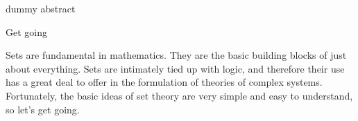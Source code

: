 \documentclass[a4paper]{cnx}
\begin{document}
\begin{cnxmodule}[id=m0001,name=Session 1: Set theory in the science of complex systems.]

\begin{metadata}[version=1.0,created=2006/08/10]
  \begin{authorlist}
    \cnxauthor[id=jj,firstname=Jeffrey,surname=Johnson,email=j.h.johnson@open.ac.uk]
  \end{authorlist}
  \begin{maintainerlist}
    \maintainer[id=ka,firstname=Katarina,surname=Alexiou,email=a.alexiou@ucl.ac.uk]
    \maintainer[id=tz,firstname=Theodore,surname=Zamenopoulos,email=t.zamenopoulos@ucl.ac.uk]
  \end{maintainerlist}
  \begin{keywordlist}
  \end{keywordlist}
  \begin{cnxabstract}
    dummy abstract
  \end{cnxabstract}

\end{metadata}


\begin{ccontent}
\begin{csection}[id=intro]{Get going}
  \begin{cpara}
    Sets are fundamental in mathematics. They are the basic building blocks of just
    about everything. Sets are intimately tied up with logic, and therefore their use
    has a great deal to offer in the formulation of theories of complex
    systems. Fortunately, the basic ideas of set theory are very simple and easy to
    understand, so let's get going.
  \end{cpara}
\end{csection}


\end{ccontent}
\end{cnxmodule}
\end{document}
